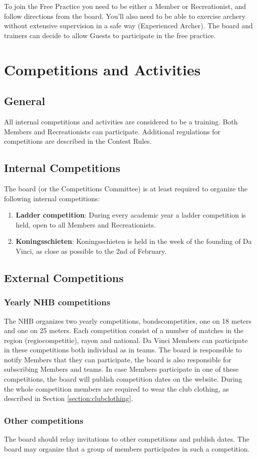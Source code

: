 \documentclass[a4paper]{article}
\newcommand{\Awr}{Contest Rules} %
\begin{document}
To join the Free Practice you need to be either a Member or Recreationist, and follow directions from the board. You'll also need to be able to exercise archery without extensive supervision in a safe way (Experienced Archer). The board and trainers can decide to allow Guests to participate in the free practice.

\section{Competitions and Activities}
\subsection{General}
All internal competitions and activities are considered to be a training. Both Members and Recreationists can participate. Additional regulations for competitions are described in the \Awr .

\subsection{Internal Competitions}
The board (or the Competitions Committee) is at least required to organize the following internal competitions: \\
\begin{enumerate}
\item \textbf{Ladder competition}: During every academic year a ladder competition is held, open to all Members and Recreationists.
\item \textbf{Koningsschieten}: Koningsschieten is held in the week of the founding of Da Vinci, as close as possible to the 2nd of February.
\end{enumerate}

\subsection{External Competitions}
\subsubsection{Yearly NHB competitions}
The NHB organizes two yearly competitions, bondscompetities, one on 18 meters and one on 25 meters. Each competition consist of a number of matches in the region (regiocompetitie), rayon and national. Da Vinci Members can participate in these competitions both individual as in teams. The board is responsible to notify Members that they can participate, the board is also responsible for subscribing Members and teams. In case Members participate in one of these competitions, the board will publish competition dates on the website. During the whole competition members are required to wear the club clothing, as described in Section \ref{section:clubclothing}.

\subsubsection{Other competitions}
The board should relay invitations to other competitions and publish dates. The board may organize that a group of members participates in such a competition.
\end{document}
